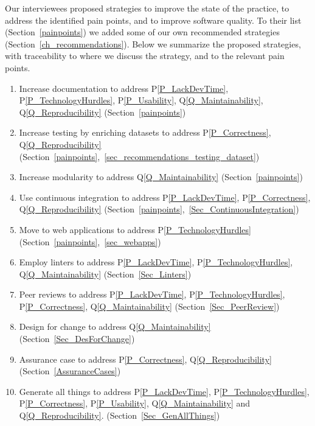 \documentclass[11pt]{article}
\newcommand{\ppref}[1]{P\ref{#1}}
\newcommand{\qref}[1]{Q\ref{#1}}
\begin{document}
Our interviewees proposed strategies to improve the state of the practice, to
address the identified pain points, and to improve software quality.  To their
list (Section~\ref{painpoints}) we added some of our own recommended strategies
(Section~\ref{ch_recommendations}).  Below we summarize the proposed strategies,
with traceability to where we discuss the strategy, and to the relevant pain
points.

\begin{enumerate}

\item Increase documentation to address \ppref{P_LackDevTime},
\ppref{P_TechnologyHurdles}, \ppref{P_Usability}, \qref{Q_Maintainability},
\qref{Q_Reproducibility} (Section~\ref{painpoints})

\item Increase testing by enriching datasets to address \ppref{P_Correctness},
\qref{Q_Reproducibility}
(Section~\ref{painpoints},~\ref{sec_recommendations_testing_dataset})

\item Increase modularity to address \qref{Q_Maintainability} (Section~\ref{painpoints})

\item Use continuous integration to address \ppref{P_LackDevTime},
\ppref{P_Correctness}, \qref{Q_Reproducibility}
(Section~\ref{painpoints},~\ref{Sec_ContinuousIntegration})

\item Move to web applications to address \ppref{P_TechnologyHurdles}
(Section~\ref{painpoints},~\ref{sec_webapps})

\item Employ linters to address \ppref{P_LackDevTime},
\ppref{P_TechnologyHurdles}, \qref{Q_Maintainability}
(Section~\ref{Sec_Linters})

\item Peer reviews to address \ppref{P_LackDevTime},
\ppref{P_TechnologyHurdles}, \ppref{P_Correctness}, \qref{Q_Maintainability}
(Section~\ref{Sec_PeerReview})

\item Design for change to address \qref{Q_Maintainability} (Section~\ref{Sec_DesForChange})

\item Assurance case to address \ppref{P_Correctness}, \qref{Q_Reproducibility}
(Section~\ref{AssuranceCases})

\item Generate all things to address \ppref{P_LackDevTime},
\ppref{P_TechnologyHurdles}, \ppref{P_Correctness}, \ppref{P_Usability},
\qref{Q_Maintainability} and \qref{Q_Reproducibility}.
(Section~\ref{Sec_GenAllThings})

\end{enumerate}
\end{document}
